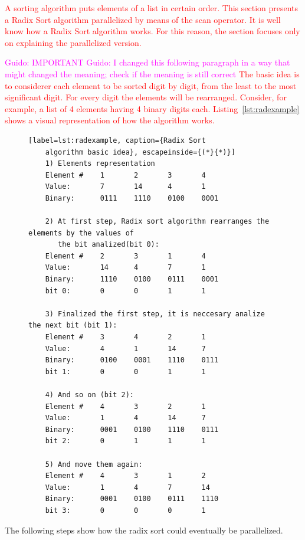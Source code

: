 \documentclass[Ingles]{ic-tese-v1}
\newcommand{\guido}[1]{\noindent\textcolor{magenta}{Guido: {#1}}}
\newcommand{\ed}[1]{\noindent\textcolor{red}{ {#1}}}
\newcommand{\guido}[1]{}
\newcommand{\ed}[1]{}
\newcommand{\rlst}[1]{Listing~\ref{lst:#1}}
\begin{document}
\ed{A sorting algorithm puts elements of a list in certain order. This section
presents a Radix Sort algorithm parallelized by means of the scan operator. It is
well know how a Radix Sort algorithm works.  For this reason, the section
focuses only on explaining the parallelized version.}

\guido{IMPORTANT}
\guido{I changed this following paragraph in a way that might changed the meaning; check if the meaning is still correct}
\ed{The basic idea is to considerer each element to be sorted digit by digit, from
the least to the most significant digit. For every digit the elements will be rearranged.
Consider, for example, a list of 4 elements having 4 binary digits each. 
\rlst{radexample} shows a visual representation of how the
algorithm works.}

\begin{figure}[t]
	\lstset{basicstyle=\scriptsize}
	\begin{lstlisting}[label=lst:radexample, caption={Radix Sort
	algorithm basic idea}, escapeinside={(*}{*)}]
	1) Elements representation
	Element #    1       2       3       4
	Value:       7       14      4       1
	Binary:      0111    1110    0100    0001

	2) At first step, Radix sort algorithm rearranges the elements by the values of
	   the bit analized(bit 0):
	Element #    2       3       1       4
	Value:       14      4       7       1
	Binary:      1110    0100    0111    0001
	bit 0:       0       0       1       1

	3) Finalized the first step, it is neccesary analize the next bit (bit 1):
	Element #    3       4       2       1
	Value:       4       1       14      7
	Binary:      0100    0001    1110    0111
	bit 1:       0       0       1       1

	4) And so on (bit 2):
	Element #    4       3       2       1
	Value:       1       4       14      7
	Binary:      0001    0100    1110    0111
	bit 2:       0       1       1       1

	5) And move them again:
	Element #    4       3       1       2
	Value:       1       4       7       14
	Binary:      0001    0100    0111    1110
	bit 3:       0       0       0       1

	\end{lstlisting}
\end{figure}

The following steps show how the radix sort could eventually be parallelized.
\end{document}
